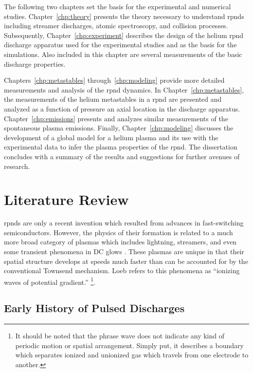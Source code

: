 The following two chapters set the basis for the experimental and numerical
studies. Chapter~\ref{chp:theory} presents the theory necessary to understand
\acs{rpnd}s including streamer discharges, atomic spectroscopy, and collision
processes. Subsequently, Chapter~\ref{chp:experiment} describes the design of
the helium \acs{rpnd} discharge apparatus used for the experimental studies and
as the basis for the simulations. Also included in this chapter are several
measurements of the basic discharge properties.

Chapters~\ref{chp:metastables} through~\ref{chp:modeling} provide more detailed
measurements and analysis of the \acs{rpnd} dynamics. In
Chapter~\ref{chp:metastables}, the measurements of the helium metastables in a
\acs{rpnd} are presented and analyzed as a function of pressure an axial
location in the discharge apparatus. Chapter~\ref{chp:emissions} presents and
analyzes similar measurements of the spontaneous plasma emissions. Finally,
Chapter~\ref{chp:modeling} discusses the development of a global model for a
helium plasma and its use with the experimental data to infer the plasma
properties of the \acs{rpnd}. The dissertation concludes with a summary of the
results and suggestions for further avenues of research.

\section{Literature Review}

\acs{rpnd}s are only a recent invention which resulted from advances in
fast-switching semiconductors. However, the physics of their formation is
related to a much more broad category of plasmas which includes lightning,
streamers, and even some transient phenomena in DC glows \cite{Loeb1965}. These
plasmas are unique in that their spatial structure develops at speeds much
faster than can be accounted for by the conventional Townsend mechanism. Loeb
refers to this phenomena as ``ionizing waves of potential gradient.'' \footnote{It should be noted that the phrase wave does not indicate
any kind of periodic motion or spatial arrangement. Simply put, it describes a
boundary which separates ionized and unionized gas which travels from one
electrode to another.}.

\subsection{Early History of Pulsed Discharges}


